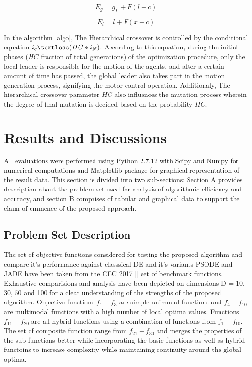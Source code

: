 \begin{equation}
\label{one}
E_g = g_L + F (l - c)
\end{equation}

\begin{equation}
\label{two}
E_l = l + F (x - c)
\end{equation}

In the algorithm \ref{algo}, The Hierarchical crossover is controlled by the conditional equation $i_c \textless (HC*i_N)$. According to this equation, during the initial phases ($HC$ fraction of total generations) of the optimization procedure, only the local leader is responsible for the motion of the agents, and after a certain amount of time has passed, the global leader also takes part in the motion generation process, signifying the motor control operation.
Additionaly, The hierarchical crossover parameter $HC$ also influences the mutation process wherein the degree of final mutation is decided based on the probability $HC$.


\section{Results and Discussions}

All evaluations were performed using Python 2.7.12 with Scipy\cite{oliphant2007python} and Numpy\cite{van2011numpy} for numerical computations and Matplotlib \cite{Hunter:2007} package for graphical representation of the result data. This section is divided into two sub-sections: Section A provides description about the problem set used for analysis of algorithmic efficiency and accuracy, and section B comprises of tabular and graphical data to support the claim of eminence of the proposed approach.

\subsection{Problem Set Description}

The set of objective functions considered for testing the proposed algorithm and compare it's performance against classsical DE and it's variants PSODE and JADE have been taken from the CEC 2017 [] set of benchmark functions. Exhaustive comparisions and analysis have been depicted on dimensions D = 10, 30, 50 and 100 for a clear understanding of the strengths of the proposed algorithm. Objective functions $f_1 - f_3$ are simple unimodal functions and $f_4 - f_10$ are multimodal functions with a high number of local optima values. Functions $f_11 - f_20$ are all hybrid functions using a combination of functions from $f_1 - f_10$. The set of composite function range from $f_21 - f_30$ and merges the properties of the sub-functions better while incorporating the basic functions as well as hybrid functoins to increase complexity while maintaining continuity around the global optima.


